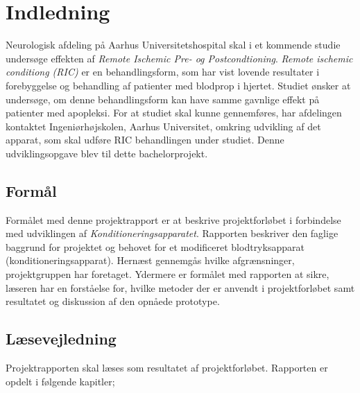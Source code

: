 \chapter{Indledning}
Neurologisk afdeling på Aarhus Universitetshospital skal i et kommende studie undersøge effekten af \textit{Remote Ischemic Pre- og Postcondtioning}. \textit{Remote ischemic conditiong (RIC)} er en behandlingsform, som har vist lovende resultater i forebyggelse og behandling af patienter med blodprop i hjertet. Studiet ønsker at undersøge, om denne behandlingsform kan have samme gavnlige effekt på patienter med apopleksi. For at studiet skal kunne gennemføres, har afdelingen kontaktet Ingeniørhøjskolen, Aarhus Universitet, omkring udvikling af det apparat, som skal udføre RIC behandlingen under studiet. Denne udviklingsopgave blev til dette bachelorprojekt. 

\section{Formål}
Formålet med denne projektrapport er at beskrive projektforløbet i forbindelse med udviklingen af \textit{Konditioneringsapparatet}. Rapporten beskriver den faglige baggrund for projektet og behovet for et modificeret blodtryksapparat (konditioneringsapparat). Hernæst gennemgås hvilke afgrænsninger, projektgruppen har foretaget. Ydermere er formålet med rapporten at sikre, læseren har en forståelse for, hvilke metoder der er anvendt i projektforløbet samt resultatet og diskussion af den opnåede prototype. 

\section{Læsevejledning}
Projektrapporten skal læses som resultatet af projektforløbet. Rapporten er opdelt i følgende kapitler;

